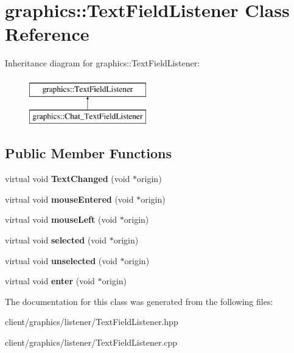 \hypertarget{classgraphics_1_1_text_field_listener}{\section{graphics\-:\-:Text\-Field\-Listener Class Reference}
\label{classgraphics_1_1_text_field_listener}
}
Inheritance diagram for graphics\-:\-:Text\-Field\-Listener\-:\begin{figure}[H]
\begin{center}
\leavevmode
\includegraphics[height=2.000000cm]{classgraphics_1_1_text_field_listener}
\end{center}
\end{figure}
\subsection*{Public Member Functions}
\begin{DoxyCompactItemize}
\item 
\hypertarget{classgraphics_1_1_text_field_listener_ad837e8ad077c55d7651427892046d618}{virtual void {\bfseries Text\-Changed} (void $\ast$origin)}\label{classgraphics_1_1_text_field_listener_ad837e8ad077c55d7651427892046d618}

\item 
\hypertarget{classgraphics_1_1_text_field_listener_abc0a9a9a2f7209983dcfd580ceb2b17f}{virtual void {\bfseries mouse\-Entered} (void $\ast$origin)}\label{classgraphics_1_1_text_field_listener_abc0a9a9a2f7209983dcfd580ceb2b17f}

\item 
\hypertarget{classgraphics_1_1_text_field_listener_a309849d92f807f4db646003c6f6e7725}{virtual void {\bfseries mouse\-Left} (void $\ast$origin)}\label{classgraphics_1_1_text_field_listener_a309849d92f807f4db646003c6f6e7725}

\item 
\hypertarget{classgraphics_1_1_text_field_listener_a07d47d8956a81bcac0b49c64a40cfcee}{virtual void {\bfseries selected} (void $\ast$origin)}\label{classgraphics_1_1_text_field_listener_a07d47d8956a81bcac0b49c64a40cfcee}

\item 
\hypertarget{classgraphics_1_1_text_field_listener_a305a58592488675cfb11ce580ee94efe}{virtual void {\bfseries unselected} (void $\ast$origin)}\label{classgraphics_1_1_text_field_listener_a305a58592488675cfb11ce580ee94efe}

\item 
\hypertarget{classgraphics_1_1_text_field_listener_a51e481163679bf43ed58564bd4c2ada4}{virtual void {\bfseries enter} (void $\ast$origin)}\label{classgraphics_1_1_text_field_listener_a51e481163679bf43ed58564bd4c2ada4}

\end{DoxyCompactItemize}


The documentation for this class was generated from the following files\-:\begin{DoxyCompactItemize}
\item 
client/graphics/listener/Text\-Field\-Listener.\-hpp\item 
client/graphics/listener/Text\-Field\-Listener.\-cpp\end{DoxyCompactItemize}

